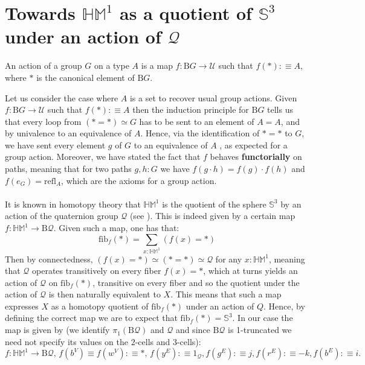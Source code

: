 \documentclass{report}
\begin{document}
\section{Towards $\mathbb{HM}^1$ as a quotient of $\mathbb{S}^3$ under an action of $\mathcal{Q}$}

\begin{mydef}
  An action of a group $G$ on a type $A$ is a map $f : \mathrm{B}G \rightarrow \mathcal{U}$ such that $f(*) :\equiv A$, where $*$ is the canonical element of $\mathrm{B}G$.
\end{mydef}
Let us consider the case where $A$ is a set to recover usual group actions. Given $f : \mathrm{B}G \rightarrow \mathcal{U}$ such that $f(*) :\equiv A$ then the induction principle for $\mathrm{B}G$ tells us that every loop from $(*=*) \simeq G$ has to be sent to an element of $A=A$, and by univalence to an equivalence of $A$. Hence, via the identification of $*=*$ to $G$, we have sent every element $g$ of $G$ to an equivalence of $A$ , as expected for a group action. Moreover, we have stated the fact that $f$ behaves \textbf{functorially} on paths, meaning that for two paths $g,h : G$ we have $f(g \cdot h) = f(g) \cdot f(h)$ and $f(e_G)=\mathrm{refl}_A$, which are the axioms for a group action. \\\\
It is known in homotopy theory that $\mathbb{HM}^1$ is the quotient of the sphere $\mathbb{S}^3$ by an action of the quaternion group $\mathcal{Q}$ (see \cite{hypercubic}). This is indeed given by a certain map $f : \mathbb{HM}^1 \rightarrow \mathrm{B} \mathcal{Q}$. Given such a map, one has that: 
$$\mathrm{fib}_f(*) = \sum_{x : \mathbb{HM}^1} (f(x) = *)$$
Then by connectedness, $(f(x)=*) \simeq (*=*) \simeq \mathcal{Q}$ for any $x : \mathbb{HM}^1$, meaning that $\mathcal{Q}$ operates transitively on every fiber $f(x)=*$, which at turns yields an action of $\mathcal{Q}$ on $\mathrm{fib}_f(*)$, transitive on every fiber and so the quotient under the action of $\mathcal{Q}$ is then naturally equivalent to $X$. This means that such a map expresses $X$ as a homotopy quotient of $\mathrm{fib}_f(*)$ under an action of $Q$. Hence, by defining the correct map we are to expect that $\mathrm{fib}_f(*) = \mathbb{S}^3$. In our case the map is given by (we identify $\pi_1(\mathrm{B}\mathcal Q)$ and $\mathcal{Q}$ and since $\mathrm{B}\mathcal{Q}$ is 1-truncated we need not specify its values on the $2$-cells and $3$-cells):
$$f : \mathbb{HM}^1 \rightarrow \mathrm{B} \mathcal{Q},\hspace{2pt} f(b^V) \equiv f(w^V) :\equiv *,\hspace{2pt} f(y^E):\equiv 1_{\mathcal{Q}}, f(g^E):\equiv j,f(r^E):\equiv -k, f(b^E):\equiv i. $$ 
\end{document}
